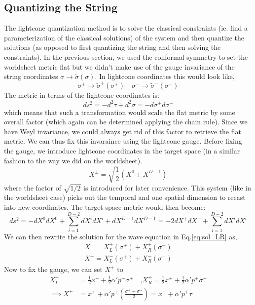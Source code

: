 \documentclass{article}
\providecommand{\brak}[1]{\ensuremath{\left(#1\right)}} %
\begin{document}
\subsection{Quantizing the String}
The lightcone quantization method is to solve the classical constraints (ie. find a parameterization of the classical solutions) of the system and then quantize the solutions (as opposed to first quantizing the string and then solving the constraints). In the previous section, we used the conformal symmetry to set the worldsheet metric flat but we didn't make use of the gauge invariance of the string coordinates $\sigma\rightarrow\tilde{\sigma}(\sigma)$. In lightcone coordinates this would look like,
\begin{equation}
	\sigma^+\rightarrow\tilde{\sigma}^+(\sigma^+)\quad\sigma^-\rightarrow\tilde{\sigma}^-(\sigma^-)
\end{equation}
The metric in terms of the lightcone coordinates is:
\begin{equation}
	ds^2=-d^2\tau+d^2\sigma = -d\sigma^+d\sigma^-
\end{equation}
which means that such a transformation would scale the flat metric by some overall factor (which again can be determined applying the chain rule). Since we have Weyl invariance, we could always get rid of this factor to retrieve the flat metric. We can thus fix this invaraince using the lightcone gauge. Before fixing the gauge, we introduce lightcone coordinates in the target space (in a similar fashion to the way we did on the worldsheet).
\begin{equation}
	X^\pm = \sqrt{\frac{1}{2}}(X^0\pm X^{D-1})\label{eq:lc_spacetime}
\end{equation}
where the factor of $\sqrt{1/2}$ is introduced for later convenience. This system (like in the worldsheet case) picks out the temporal and one spatial dimension to recast into new coordinates. The target space metric would then become:
\begin{equation}
	ds^2 = -dX^0dX^0+\sum_{i=1}^{D-2}dX^idX^i +dX^{D-1}dX^{D-1}= -2dX^+dX^-+ \sum_{i=1}^{D-2}dX^idX^i
\end{equation}
We can then rewrite the solution for the wave equation in Eq.\eqref{eq:sol_LR} as,
\begin{align}
	X^+=X^+_L(\sigma^+)+X^+_R(\sigma^-)\\
	X^-=X^-_L(\sigma^+)+X^-_R(\sigma^-)
\end{align}
Now to fix the gauge, we can set $X^+$ to 
\begin{align}
	X^+_L &= \frac{1}{2}x^++\frac{1}{2}\alpha'p^+\sigma^+\quad\text{,}	X^+_R = \frac{1}{2}x^++\frac{1}{2}\alpha'p^+\sigma^-\\
	\implies X^+ &= x^++\alpha'p^+\brak{\frac{\sigma^++\sigma^-}{2}}=x^++\alpha'p^+\tau\label{eq:xplus}
\end{align}
\end{document}
